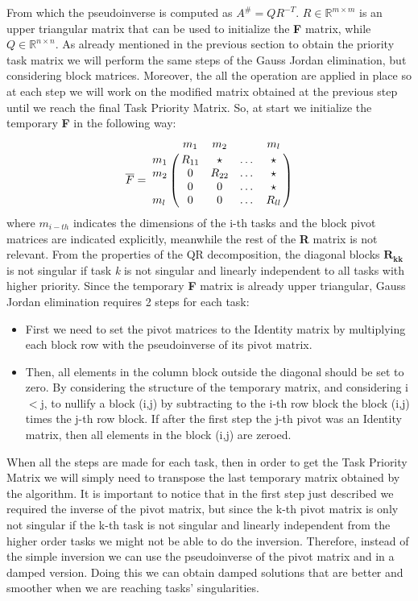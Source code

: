 \documentclass[12pt, a4paper]{article}
\newcommand{\R}{\mathbb{R}}
\begin{document}
From which the pseudoinverse is computed as $A^\# = QR^{-T}$. $R \in \R^{m\times m}$ is an upper triangular matrix that can be used to initialize the \textbf{F} matrix, while $Q \in \R^{n\times n}$.
As already mentioned in the previous section to obtain the priority task matrix we will perform the same steps of the Gauss Jordan elimination, but considering block matrices. Moreover, the all the operation are applied in place so at each step we will work on the modified matrix obtained at the previous step until we reach the final Task Priority Matrix.
So, at start we initialize the temporary \textbf{F} in the following way:
\[
\overline{F} = \bordermatrix{
~& m_1 & m_2 & & m_l\cr
m_1 & R_{11} & \star & \dots & \star \cr
m_2 & 0 & R_{22} & \dots & \star \cr
~ & 0 & 0 & \dots & \star \cr
m_l & 0 & 0 & \dots & R_{ll}
}
\]
where $m_{i-th}$ indicates the dimensions of the i-th tasks and the block pivot matrices are indicated explicitly, meanwhile the rest of the \textbf{R} matrix is not relevant.
From the properties of the QR decomposition, the diagonal blocks $\textbf{R}_{\textbf{kk}}$ is not singular if task \emph{k} is not singular and linearly independent to all tasks with higher priority.
Since the temporary \textbf{F} matrix is already upper triangular, Gauss Jordan elimination requires 2 steps for each task:
\begin{itemize}
\item First we need to set the pivot matrices to the Identity matrix by multiplying each block row with the pseudoinverse of its pivot matrix.
\item Then, all elements in the column block outside the diagonal should be set to zero. By considering the structure of the temporary matrix, and considering i$<$j, to nullify a block (i,j) by subtracting to the i-th row block the block (i,j) times the j-th row block. If after the first step the j-th pivot was an Identity matrix, then all elements in the block (i,j) are zeroed.
\end{itemize}
When all the steps are made for each task, then in order to get the Task Priority Matrix we will simply need to transpose the last temporary matrix obtained by the algorithm.
It is important to notice that in the first step just described we required the inverse of the pivot matrix, but since the k-th pivot matrix is only not singular if the k-th task is not singular and linearly independent from the higher order tasks we might not be able to do the inversion. Therefore, instead of the simple inversion we can use the pseudoinverse of the pivot matrix and in a damped version. Doing this we can obtain damped solutions that are better and smoother when we are reaching tasks' singularities.
\end{document}
